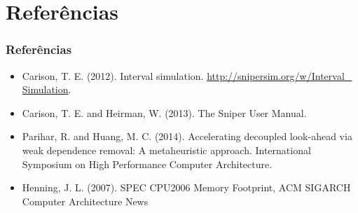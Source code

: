 \documentclass[10pt]{beamer}
\begin{document}
\section{Referências}
\begin{frame}
\frametitle{Referências}

\begin{itemize}
  \item Carison, T. E. (2012). Interval simulation.
  \url{http://snipersim.org/w/Interval_ Simulation}. 
\item Carison, T. E. and Heirman, W. (2013). The Sniper User Manual.
\item Parihar, R. and Huang, M. C. (2014). Accelerating decoupled look-ahead via
weak dependence removal: A metaheuristic approach. International Symposium on High Performance Computer Architecture.
\item Henning, J. L. (2007). SPEC CPU2006 Memory Footprint, ACM SIGARCH
Computer Architecture News
\end{itemize}

\end{frame}
\end{document}
